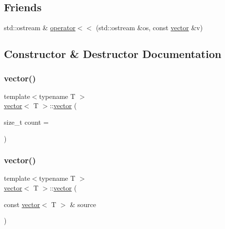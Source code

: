 \subsection*{Friends}
\begin{DoxyCompactItemize}
\item 
std\+::ostream \& \hyperlink{classvector_add6bce5bf4a9ad1887f2b17dd4cc4184}{operator$<$$<$} (std\+::ostream \&os, const \hyperlink{classvector}{vector} \&v)
\end{DoxyCompactItemize}


\subsection{Constructor \& Destructor Documentation}
\mbox{\label{classvector_a3a83d5c85147ccc1a6de86a1204f0e06}} 
\subsubsection{\texorpdfstring{vector()}{vector()}\hspace{0.1cm}{\footnotesize\ttfamily [1/2]}}
{\footnotesize\ttfamily template$<$typename T $>$ \\
\hyperlink{classvector}{vector}$<$ T $>$\+::\hyperlink{classvector}{vector} (\begin{DoxyParamCaption}\item[{size\+\_\+t}]{count = {} }\end{DoxyParamCaption})\hspace{0.3cm}{\ttfamily [inline]}}

\mbox{\label{classvector_aab47f935167e9fca4dc2aec378cee271}} 
\subsubsection{\texorpdfstring{vector()}{vector()}\hspace{0.1cm}{\footnotesize\ttfamily [2/2]}}
{\footnotesize\ttfamily template$<$typename T $>$ \\
\hyperlink{classvector}{vector}$<$ T $>$\+::\hyperlink{classvector}{vector} (\begin{DoxyParamCaption}\item[{const \hyperlink{classvector}{vector}$<$ T $>$ \&}]{source }\end{DoxyParamCaption})\hspace{0.3cm}{\ttfamily [inline]}}

